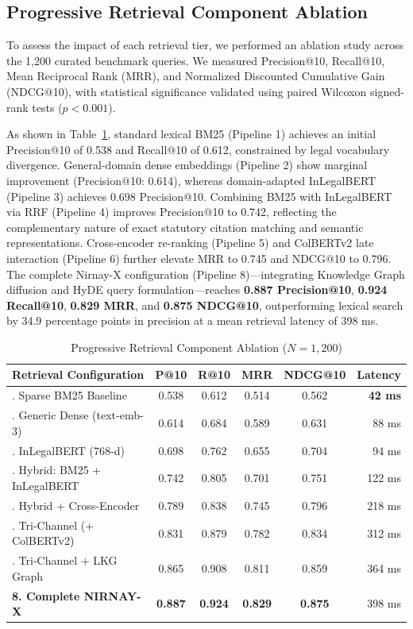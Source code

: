 \documentclass[conference]{IEEEtran}
\begin{document}
\subsection{Progressive Retrieval Component Ablation}
To assess the impact of each retrieval tier, we performed an ablation study across the 1,200 curated benchmark queries. We measured Precision@10, Recall@10, Mean Reciprocal Rank (MRR), and Normalized Discounted Cumulative Gain (NDCG@10), with statistical significance validated using paired Wilcoxon signed-rank tests ($p < 0.001$).

As shown in Table~\ref{tab:retrieval_ablation}, standard lexical BM25 (Pipeline 1) achieves an initial Precision@10 of 0.538 and Recall@10 of 0.612, constrained by legal vocabulary divergence. General-domain dense embeddings (Pipeline 2) show marginal improvement (Precision@10: 0.614), whereas domain-adapted InLegalBERT (Pipeline 3) achieves 0.698 Precision@10. Combining BM25 with InLegalBERT via RRF (Pipeline 4) improves Precision@10 to 0.742, reflecting the complementary nature of exact statutory citation matching and semantic representations. Cross-encoder re-ranking (Pipeline 5) and ColBERTv2 late interaction (Pipeline 6) further elevate MRR to 0.745 and NDCG@10 to 0.796. The complete Nirnay-X configuration (Pipeline 8)---integrating Knowledge Graph diffusion and HyDE query formulation---reaches \textbf{0.887 Precision@10}, \textbf{0.924 Recall@10}, \textbf{0.829 MRR}, and \textbf{0.875 NDCG@10}, outperforming lexical search by 34.9 percentage points in precision at a mean retrieval latency of 398 ms.

\begin{table}[!t]
\caption{Progressive Retrieval Component Ablation ($N=1,200$)}
\label{tab:retrieval_ablation}
\centering
\footnotesize
\setlength{\tabcolsep}{2pt}
\begin{tabularx}{\columnwidth}{>{\raggedright\arraybackslash}Xccccr}
\toprule
\textbf{Retrieval Configuration} & \textbf{P@10} & \textbf{R@10} & \textbf{MRR} & \textbf{NDCG@10} & \textbf{Latency} \\
\midrule
1. Sparse BM25 Baseline & 0.538 & 0.612 & 0.514 & 0.562 & \textbf{42 ms} \\
2. Generic Dense (text-emb-3) & 0.614 & 0.684 & 0.589 & 0.631 & 88 ms \\
3. InLegalBERT (768-d) & 0.698 & 0.762 & 0.655 & 0.704 & 94 ms \\
4. Hybrid: BM25 + InLegalBERT & 0.742 & 0.805 & 0.701 & 0.751 & 122 ms \\
5. Hybrid + Cross-Encoder & 0.789 & 0.838 & 0.745 & 0.796 & 218 ms \\
6. Tri-Channel (+ ColBERTv2) & 0.831 & 0.879 & 0.782 & 0.834 & 312 ms \\
7. Tri-Channel + LKG Graph & 0.865 & 0.908 & 0.811 & 0.859 & 364 ms \\
\midrule
\textbf{8. Complete NIRNAY-X} & \textbf{0.887} & \textbf{0.924} & \textbf{0.829} & \textbf{0.875} & 398 ms \\
\bottomrule
\end{tabularx}
\end{table}
\end{document}
